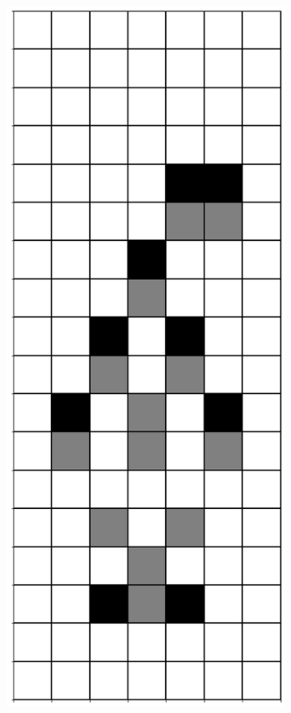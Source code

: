 \documentclass[12pt]{article}
\numberwithin{figure}{section} %
\begin{document}
\begin{figure}[H]
\begin{subfigure}{0.18\textwidth}
     		\subcaption{}
   	\end{subfigure}
     	\begin{subfigure}{0.18\textwidth}
     		\centering
     		\includegraphics[width=\linewidth]{Section4/18.1}

\end{subfigure}
\end{figure}
\end{document}
